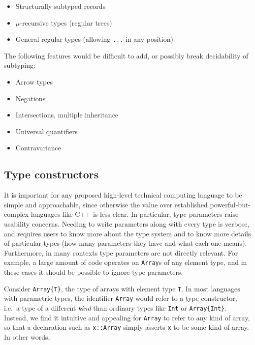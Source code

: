 \vspace{-3ex}
\begin{singlespace}
\begin{itemize}
\item Structurally subtyped records
\item $\mu$-recursive types (regular trees)
\item General regular types (allowing \texttt{...} in any position)
\end{itemize}
\end{singlespace}

\noindent
The following features would be difficult to add, or possibly break decidability
of subtyping:

\vspace{-3ex}
\begin{singlespace}
\begin{itemize}
\item Arrow types
\item Negations
\item Intersections, multiple inheritance
\item Universal quantifiers
\item Contravariance
\end{itemize}
\end{singlespace}


\subsection{Type constructors}

It is important for any proposed high-level technical computing language to be
simple and approachable, since otherwise the value over established
powerful-but-complex languages like C++ is less clear.
In particular, type parameters raise usability concerns.
Needing to write parameters along with every type is verbose, and requires users
to know more about the type system and to know more details of particular
types (how many parameters they have and what each one means).
Furthermore, in many contexts type parameters are not directly relevant.
For example, a large amount of code operates on \texttt{Array}s of any
element type, and in these cases it should be possible to ignore type parameters.

Consider \texttt{Array\{T\}}, the type of arrays with element type \texttt{T}.
In most languages with parametric types, the identifier \texttt{Array} would
refer to a type constructor, i.e.\ a type of a different \emph{kind} than
ordinary types like \texttt{Int} or \texttt{Array\{Int\}}.
Instead, we find it intuitive and appealing for \texttt{Array} to refer to
any kind of array, so that a declaration such as \texttt{x::Array} simply
asserts \texttt{x} to be some kind of array.
In other words,

